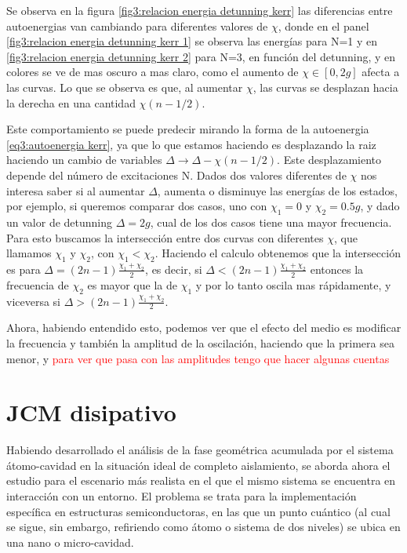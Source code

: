 Se observa en la figura \ref{fig3:relacion energia detunning kerr} las diferencias entre autoenergias van cambiando para diferentes valores de $\chi$, donde en el panel \ref{fig3:relacion energia detunning kerr 1} se observa las energías para N=1 y en \ref{fig3:relacion energia detunning kerr 2} para N=3, en función del detunning, y en colores se ve de mas oscuro a mas claro, como el aumento de $\chi \in [0,2g]$ afecta a las curvas. Lo que se observa es que, al aumentar $\chi$, las curvas se desplazan hacia la derecha en una cantidad $\chi(n-1/2)$. 

Este comportamiento se puede predecir mirando la forma de la autoenergia \ref{eq3:autoenergia kerr}, ya que lo que estamos haciendo es desplazando la raiz haciendo un cambio de variables $\Delta \rightarrow \Delta - \chi(n-1/2)$. Este desplazamiento depende del número de excitaciones N. 
Dados dos valores diferentes de $\chi$ nos interesa saber si al aumentar $\Delta$, aumenta o disminuye las energías de los estados, por ejemplo, si queremos comparar dos casos, uno con $\chi_1=0$ y $\chi_2=0.5g$, y dado un valor de detunning $\Delta=2g$, cual de los dos casos tiene una mayor frecuencia. Para esto buscamos la intersección entre dos curvas con diferentes $\chi$, que llamamos $\chi_1$ y $\chi_2$, con $\chi_1<\chi_2$. Haciendo el calculo obtenemos que la intersección es para $\Delta=(2n-1)\frac{\chi_1+\chi_2}{2}$, es decir, si $\Delta<(2n-1)\frac{\chi_1+\chi_2}{2}$ entonces la frecuencia de $\chi_2$ es mayor que la de $\chi_1$ y por lo tanto oscila mas rápidamente, y viceversa si $\Delta>(2n-1)\frac{\chi_1+\chi_2}{2}$.

Ahora, habiendo entendido esto, podemos ver que el efecto del medio es modificar la frecuencia y también la amplitud de la oscilación, haciendo que la primera sea menor, y \textcolor{red}{para ver que pasa con las amplitudes tengo que hacer algunas cuentas}


\section{JCM disipativo} 
\label{sec3:jcm disipativo}


Habiendo desarrollado el análisis de la fase geométrica acumulada por el sistema átomo-cavidad en la situación ideal de completo aislamiento, se aborda ahora el estudio para el escenario más realista en el que el mismo sistema se encuentra en interacción con un entorno. El problema se trata para la implementación específica en estructuras semiconductoras, en las que un punto cuántico (al cual se sigue, sin embargo, refiriendo como átomo o sistema de dos niveles) se ubica en una nano o micro-cavidad.


